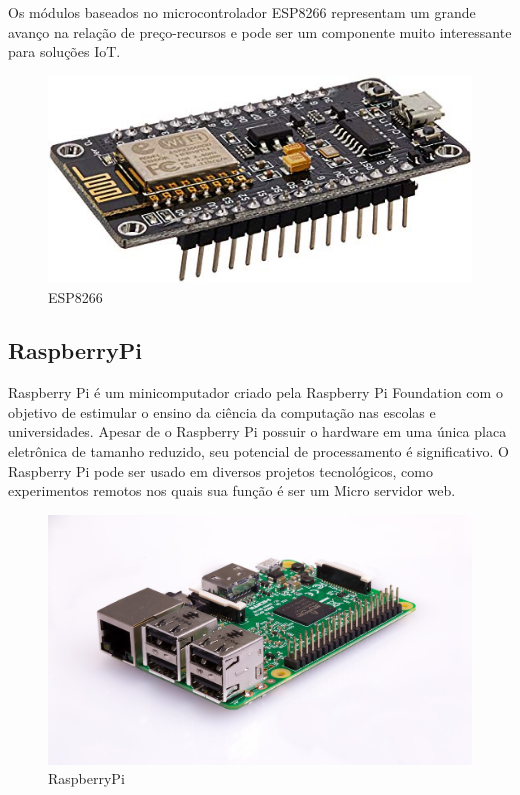 Os módulos baseados no microcontrolador ESP8266 representam um grande avanço na relação de preço-recursos e pode ser um componente muito interessante para soluções IoT.\cite {de2017internet}

\begin{figure}[htbp]
		\centering
		\includegraphics[scale=0.5]{figuras/esp8266_.jpg}
		\caption{ESP8266}
		\label{fig:01}
\end{figure}


\subsection{RaspberryPi}

Raspberry Pi é um minicomputador criado pela Raspberry Pi Foundation com o objetivo de estimular o ensino da ciência da computação nas escolas e universidades. Apesar de o Raspberry Pi possuir o hardware em uma única placa eletrônica de tamanho reduzido, seu potencial de processamento é significativo. O Raspberry Pi pode ser usado em diversos projetos tecnológicos, como experimentos remotos nos quais sua função é ser um Micro servidor web.\cite{crotti2013raspberrypi}

\begin{figure}[htbp]
		\centering
		\includegraphics[scale=0.2]{figuras/raspberrypi.jpg}
		\caption{RaspberryPi}
		\label{fig:02}
\end{figure}

